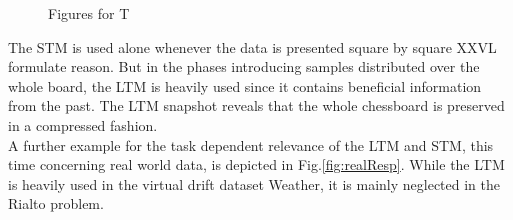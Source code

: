\documentclass[conference]{IEEEtran}
\begin{document}
\begin{figure}
\centering
	\vspace{0 pt}
\caption{Figures for T}
\label{fig:chess}
\end{figure}
The STM is used alone whenever the data is presented square by square XXVL formulate reason. But in the phases introducing samples distributed over the whole board, the LTM
is heavily used since it contains beneficial information from the past. The LTM snapshot reveals that the whole chessboard is preserved in a compressed fashion.\\
A further example for the task dependent relevance of the LTM and STM, this time concerning real world data, is depicted in Fig.\ref{fig:realResp}. 
While the LTM is heavily used in the virtual drift dataset Weather, it is mainly neglected in the Rialto problem.
\end{document}
